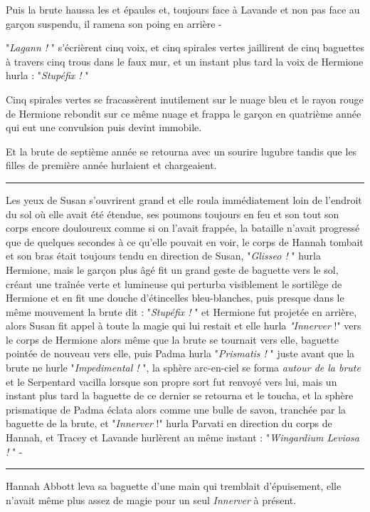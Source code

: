 Puis la brute haussa les et épaules et, toujours face à Lavande et non pas face au garçon suspendu, il ramena son poing en arrière -

"\emph{Lagann !} " s'écrièrent cinq voix, et cinq spirales vertes jaillirent de cinq baguettes à travers cinq trous dans le faux mur, et un instant plus tard la voix de Hermione hurla : "\emph{Stupéfix !} "

Cinq spirales vertes se fracassèrent inutilement sur le nuage bleu et le rayon rouge de Hermione rebondit sur ce même nuage et frappa le garçon en quatrième année qui eut une convulsion puis devint immobile.

Et la brute de septième année se retourna avec un sourire lugubre tandis que les filles de première année hurlaient et chargeaient.
\par\noindent\rule{\textwidth}{0.4pt}
Les yeux de Susan s'ouvrirent grand et elle roula immédiatement loin de l'endroit du sol où elle avait été étendue, ses poumons toujours en feu et son tout son corps encore douloureux comme si on l'avait frappée, la bataille n'avait progressé que de quelques secondes à ce qu'elle pouvait en voir, le corps de Hannah tombait et son bras était toujours tendu en direction de Susan, "\emph{Glisseo !} " hurla Hermione, mais le garçon plus âgé fit un grand geste de baguette vers le sol, créant une traînée verte et lumineuse qui perturba visiblement le sortilège de Hermione et en fit une douche d'étincelles bleu-blanches, puis presque dans le même mouvement la brute dit : "\emph{Stupéfix !} " et Hermione fut projetée en arrière, alors Susan fit appel à toute la magie qui lui restait et elle hurla \emph{"Innerver}  !" vers le corps de Hermione alors même que la brute se tournait vers elle, baguette pointée de nouveau vers elle, puis Padma hurla "\emph{Prismatis !} " juste avant que la brute ne hurle "\emph{Impedimental !} ", la sphère arc-en-ciel se forma \emph{autour de la brute}  et le Serpentard vacilla lorsque son propre sort fut renvoyé vers lui, mais un instant plus tard la baguette de ce dernier se retourna et le toucha, et la sphère prismatique de Padma éclata alors comme une bulle de savon, tranchée par la baguette de la brute, et "\emph{Innerver}  !" hurla Parvati en direction du corps de Hannah, et Tracey et Lavande hurlèrent au même instant : "\emph{Wingardium Leviosa !} " -
\par\noindent\rule{\textwidth}{0.4pt}
Hannah Abbott leva sa baguette d'une main qui tremblait d'épuisement, elle n'avait même plus assez de magie pour un seul \emph{Innerver}  à présent.


